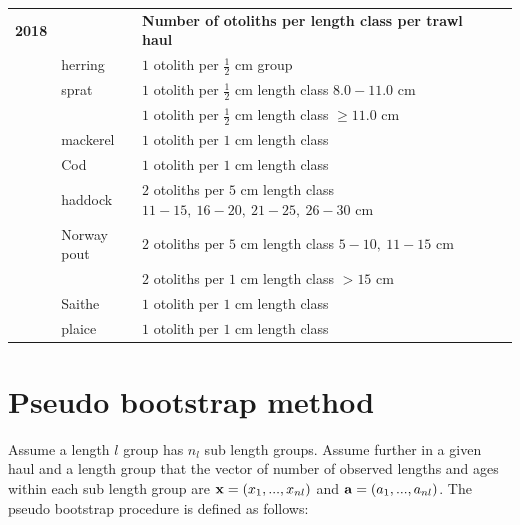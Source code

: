 \documentclass[a4paper 12pt]{article}
\numberwithin{equation}{section}
\newcommand{\ed}[1]{\textcolor{red}{#1}}
\begin{document}
\begin{small}
\begin{table}[h!]
\begin{tabularx}{\linewidth}{r l l l l X}
{\bf 2018} & & {\bf Number of otoliths per length class per trawl haul}  \\[1.0ex]
  & herring  &  $1$  otolith per $\frac{1}{2}$ cm group \\[0.5ex]
     & sprat    & $1$  otolith per $\frac{1}{2}$ cm length class  $8.0 -11.0$ cm\\[0.5ex]
              & & $1$  otolith per $\frac{1}{2}$ cm length class  $\geq 11.0$ cm\\[0.5ex]
& mackerel      & $1$  otolith per $1$ cm length class \\[0.5ex]
& Cod       	  & $1$  otolith per $1$ cm length class\\[0.5ex]
& haddock & $2$  otoliths per $5$ cm length class $11 -15, \ 16-20, \ 21-25, \ 26-30$ cm \\[0.5ex]
& Norway pout & $2$  otoliths per $5$ cm length class $5 -10, \ 11-15$ cm\\[0.5ex]
               & & $2$  otoliths per $1$ cm length class $> 15$ cm\\[1.0ex]
&Saithe        & $1$  otolith per $1$ cm length class \\[0.5ex]  
&plaice       & $1$  otolith per $1$ cm length class \\[0.1ex]
\bottomrule         
\end{tabularx}
\end{table}
\end{small}


\section{Pseudo bootstrap method}
\label{secAp:pseudobootstrap}

Assume a length $l$ group has $n_{l}$ sub length groups. Assume further in a given haul and a length group that the vector of number of observed lengths and ages within each sub length group are ${\bf x} = \left(x_{1},...,x_{nl}\right)$ and ${\bf a} = \left(a_{1},...,a_{nl}\right)$.  The pseudo bootstrap procedure is defined as follows:
\end{document}
